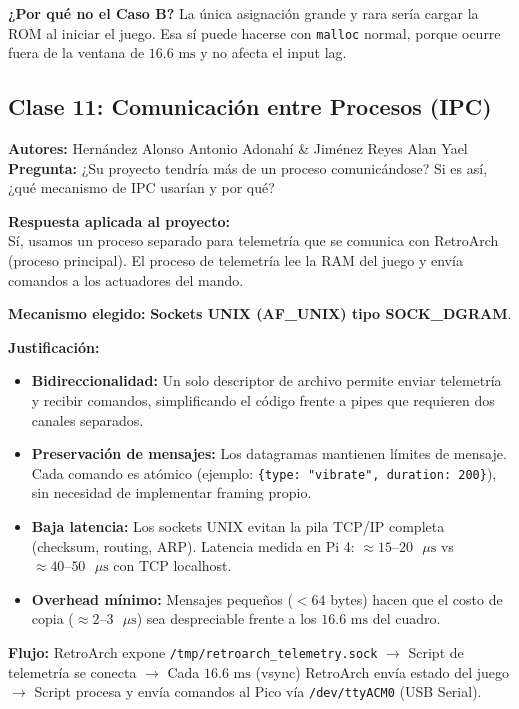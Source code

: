 \documentclass[conference]{IEEEtran}
\begin{document}
\textbf{¿Por qué no el Caso B?} La única asignación grande y rara sería cargar la ROM al iniciar el juego. Esa sí puede hacerse con \texttt{malloc} normal, porque ocurre fuera de la ventana de $16.6\text{ ms}$ y no afecta el input lag.

\subsection{Clase 11: Comunicación entre Procesos (IPC)}
\textbf{Autores:} Hernández Alonso Antonio Adonahí \& Jiménez Reyes Alan Yael \\
\textbf{Pregunta:} ¿Su proyecto tendría más de un proceso comunicándose? Si es así, ¿qué mecanismo de IPC usarían y por qué?

\textbf{Respuesta aplicada al proyecto:} \\
Sí, usamos un proceso separado para telemetría que se comunica con RetroArch (proceso principal). El proceso de telemetría lee la RAM del juego y envía comandos a los actuadores del mando.

\textbf{Mecanismo elegido:} \textbf{Sockets UNIX (AF\_UNIX) tipo SOCK\_DGRAM}.

\textbf{Justificación:}
\begin{itemize}
	\item \textbf{Bidireccionalidad:} Un solo descriptor de archivo permite enviar telemetría y recibir comandos, simplificando el código frente a pipes que requieren dos canales separados.
	\item \textbf{Preservación de mensajes:} Los datagramas mantienen límites de mensaje. Cada comando es atómico (ejemplo: \texttt{\{type: "vibrate", duration: 200\}}), sin necesidad de implementar framing propio.
	\item \textbf{Baja latencia:} Los sockets UNIX evitan la pila TCP/IP completa (checksum, routing, ARP). Latencia medida en Pi 4: $\approx 15\text{--}20\text{ }\mu\text{s}$ vs $\approx 40\text{--}50\text{ }\mu\text{s}$ con TCP localhost.
	\item \textbf{Overhead mínimo:} Mensajes pequeños ($< 64$ bytes) hacen que el costo de copia ($\approx 2\text{--}3\text{ }\mu\text{s}$) sea despreciable frente a los $16.6\text{ ms}$ del cuadro.
\end{itemize}

\textbf{Flujo:} RetroArch expone \texttt{/tmp/retroarch\_telemetry.sock} $\rightarrow$ Script de telemetría se conecta $\rightarrow$ Cada $16.6\text{ ms}$ (vsync) RetroArch envía estado del juego $\rightarrow$ Script procesa y envía comandos al Pico vía \texttt{/dev/ttyACM0} (USB Serial).
\end{document}
